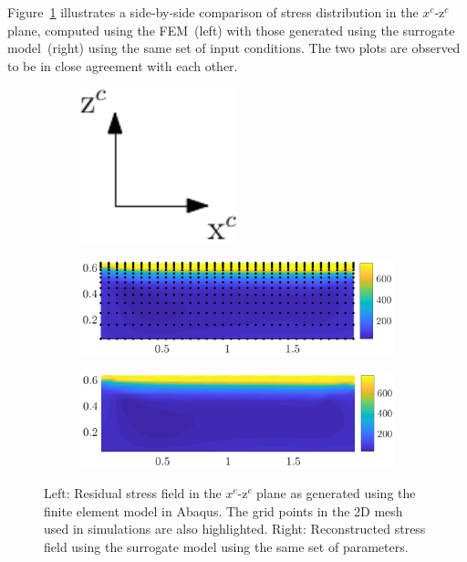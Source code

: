 Figure~\ref{fig:RS_comp} illustrates a side-by-side comparison of stress distribution in the $x^c$-z$^c$ plane,
computed using the FEM~(left) with those generated using the surrogate model~(right) using the same
set of input conditions. The two plots
are observed to be in close agreement with each other.  
%
\begin{figure}[htbp]
\begin{center}
\begin{subfigure}{0.15\textwidth}
\vspace{10mm}
\includegraphics[width=0.5\textwidth]{./Figures/xczc} 
\end{subfigure}
\hspace{-1.5cm}
\begin{subfigure}{0.35\textwidth}
\includegraphics[width=1.0\textwidth]{./Figures/origZ_sam13} 
\end{subfigure}
\hspace{0.25cm}
\begin{subfigure}{0.35\textwidth}
\includegraphics[width=1.0\textwidth]{./Figures/recZ_sam13} 
\end{subfigure}
\end{center}
\caption{Left: Residual stress field in the $x^c$-z$^c$ plane as generated using the 
finite element model in Abaqus. The grid points in the 2D mesh used in simulations are also highlighted. 
Right: Reconstructed stress field using the surrogate model using the same set of parameters. }

\label{fig:RS_comp}
\end{figure}

